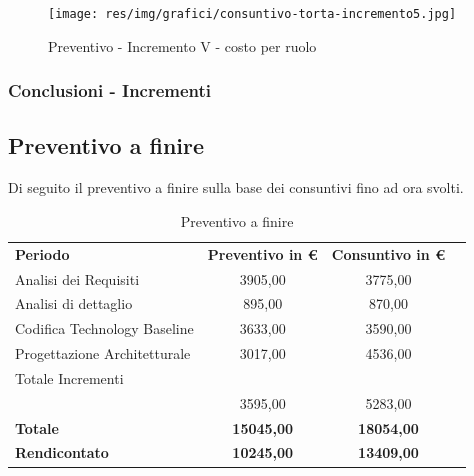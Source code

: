 \begin{figure} [h!]
	\centering
	\texttt{[image: res/img/grafici/consuntivo-torta-incremento5.jpg]}
	\caption{Preventivo - Incremento V  - costo per ruolo} 
\end{figure}

\subsubsection{Conclusioni - Incrementi}
\newpage


\subsection{Preventivo a finire}
Di seguito il preventivo a finire sulla base dei consuntivi fino ad ora svolti.
\begin{table} [h!]
	\begin{center}
		\begin{tabular} { m{8 cm} c c c  }
			\rowcolor{lightgray}
			\textbf{Periodo}  & \textbf{Preventivo in \euro} & \textbf{Consuntivo in \euro} \\
			Analisi dei Requisiti   			& 3905,00     & 3775,00 \\
			Analisi di dettaglio  				& 895,00     & 870,00 \\
			Codifica Technology Baseline        & 3633,00     & 3590,00 \\
			Progettazione Architetturale		&3017,00		&  4536,00\\
			Totale Incrementi\\					& 3595,00		&	5283,00\\
			\textbf{Totale}     & \textbf{15045,00}         & \textbf{18054,00}   \\
			\textbf{Rendicontato}  & \textbf{10245,00}          & \textbf{13409,00}   \\
			
			
		\end{tabular}
		\caption{Preventivo a finire }
	\end{center}
\end{table}
 \\

